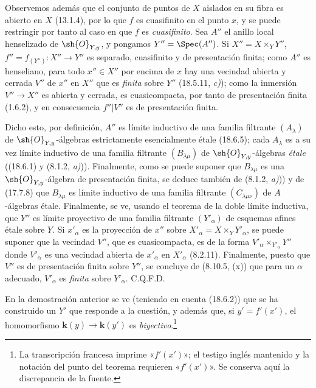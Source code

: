 Observemos además que el conjunto de puntos de $X$ aislados en su fibra es abierto en $X$ (13.1.4), por lo que $f$ es cuasifinito en el punto $x$, y se puede restringir por tanto al caso en que $f$ es \emph{cuasifinito}. Sea $A''$ el anillo local henselizado de $\sh{O}_{Y,y}$, y pongamos $Y''=\Spec(A'')$. Si $X''=X\times_Y Y''$, $f''=f_{(Y'')}:X''\to Y''$ es separado, cuasifinito y de presentación finita; como $A''$ es henseliano, para todo $x''\in X''$ por encima de $x$ hay una vecindad abierta y cerrada $V''$ de $x''$ en $X''$ que es \emph{finita} sobre $Y''$ (18.5.11, \emph{c)}); como la inmersión $V''\to X''$ es abierta y cerrada, es cuasicompacta, por tanto de presentación finita (1.6.2), y en consecuencia $f''|V''$ es de presentación finita.

Dicho esto, por definición, $A''$ es límite inductivo de una familia filtrante $(A_\lambda)$ de $\sh{O}_{Y,y}$-álgebras estrictamente esencialmente étale (18.6.5); cada $A_\lambda$ es a su vez límite inductivo de una familia filtrante $(B_{\lambda\mu})$ de $\sh{O}_{Y,y}$-álgebras \emph{étale} ((18.6.1) y (8.1.2, \emph{a)})). Finalmente, como se puede suponer que $B_{\lambda\mu}$ es una $\sh{O}_{Y,y}$-álgebra de presentación finita, se deduce también de (8.1.2, \emph{a)})) y de (17.7.8) que $B_{\lambda\mu}$ es límite inductivo de una familia filtrante $(C_{\lambda\mu\nu})$ de $A$-álgebras étale. Finalmente, se ve, usando el teorema de la doble límite inductiva, que $Y''$ es límite proyectivo de una familia filtrante $(Y'_\alpha)$ de esquemas afines étale sobre $Y$. Si $x'_\alpha$ es la proyección de $x''$ sobre $X'_\alpha=X\times_Y Y'_\alpha$, se puede suponer que la vecindad $V''$, que es cuasicompacta, es de la forma $V'_\alpha\times_{Y'_\alpha}Y''$ donde $V'_\alpha$ es una vecindad abierta de $x'_\alpha$ en $X'_\alpha$ (8.2.11). Finalmente, puesto que $V''$ es de presentación finita sobre $Y''$, se concluye de (8.10.5, (x)) que para un $\alpha$ adecuado, $V'_\alpha$ es \emph{finita} sobre $Y'_\alpha$. C.Q.F.D.

\begin{remark}[18.12.2]
\label{IV.18.12.2}
En la demostración anterior se ve (teniendo en cuenta (18.6.2)) que se ha construido un $Y'$ que responde a la cuestión, y además que, si $y'=f'(x')$, el homomorfismo $\boldsymbol{k}(y)\to\boldsymbol{k}(y')$ es \emph{biyectivo}.\footnote{La transcripción francesa imprime «$f'(x')$»; el testigo inglés mantenido y la notación del punto del teorema requieren «$f'(x')$». Se conserva aquí la discrepancia de la fuente.}
\end{remark}

